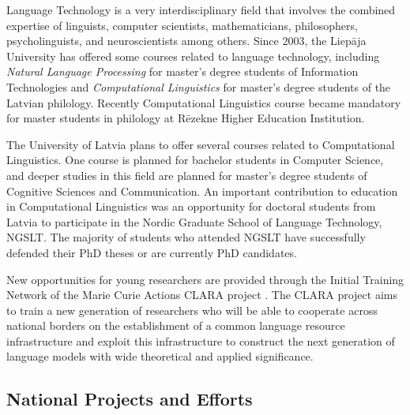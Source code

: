 \begin{multicols}{2}
Language Technology is a very interdisciplinary field that involves the combined expertise of linguists, computer scientists, mathematicians, philosophers, psycholinguists, and neuroscientists among others.
Since 2003, the Liepāja University has offered some courses related to language technology, including \textit{Natural Language Processing }for master's degree students of Information Technologies and \textit{Computational Linguistics} for master's degree students of the Latvian philology. 
Recently Computational Linguistics course became mandatory for master students in philology at Rēzekne Higher Education Institution.

The University of Latvia plans to offer several courses related to Computational Linguistics.  One course is planned for bachelor students in Computer Science, and deeper studies in this field are planned for master's degree students of Cognitive Sciences and Communication.
%
An important contribution to education in Computational Linguistics was an opportunity for doctoral students from Latvia to participate in the Nordic Graduate School of Language Technology, NGSLT.
The majority of students who attended NGSLT have successfully defended their PhD theses or are currently PhD candidates.

New opportunities for young researchers are provided through the Initial Training Network of the Marie Curie Actions CLARA project \cite{Meta38}.
The CLARA project aims to train a new generation of researchers who will be able to cooperate across national borders on the establishment of a common language resource infrastructure and exploit this infrastructure to construct the next generation of language models with wide theoretical and applied significance.

\subsection{National Projects and Efforts}


\end{multicols}
